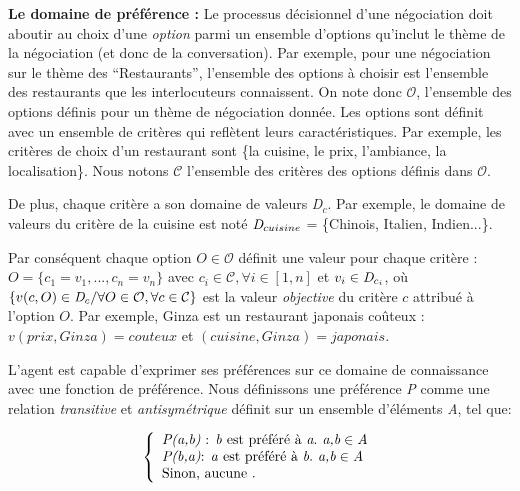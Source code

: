 \documentclass [french]{sig-alternate-05-2015}
\begin{document}

\par \textbf{Le domaine de préférence :}
Le processus décisionnel d'une négociation  doit aboutir au choix d'une \emph{option} parmi un ensemble d'options qu'inclut le thème de la négociation (et donc de la conversation). Par exemple, pour une négociation sur le thème des ``Restaurants'', l'ensemble des options à choisir est l'ensemble des restaurants que les interlocuteurs connaissent.
 On note donc $\mathcal{O}$, l'ensemble des options définis pour un thème de négociation donnée. Les options sont définit avec un ensemble de critères qui reflètent leurs caractéristiques. Par exemple, les critères de choix d'un restaurant sont \{la cuisine, le prix, l'ambiance, la localisation\}. Nous notons $\mathcal{C}$ l'ensemble des critères des options définis dans $\mathcal{O}$.
 \par De plus, chaque critère a son domaine de valeurs \emph{D$_c$}. Par exemple, le domaine de valeurs du critère de la cuisine est noté $\emph{D}_{cuisine}$ = \{Chinois, Italien, Indien...\}.

\par Par conséquent chaque option $O\in \mathcal{O}$ définit une valeur pour chaque critère : 
$O = \{c_1=v_1,..., c_n=v_n\}$ avec $c_i \in \mathcal{C}, \forall i \in [1,n]$ et $v_i\in \emph{D}_{c_i}$, où $\{v(c,O) \in \emph{D}_{c} / \forall O \in \mathcal{O}, \forall c \in \mathcal{C}\}$ est la valeur \emph{objective} du critère $c$ attribué à l'option $O$. 
Par exemple, Ginza est un restaurant japonais coûteux : $v(prix, Ginza) = couteux $ et $(cuisine, Ginza) = japonais$. 


\par L'agent est capable d'exprimer ses préférences sur ce domaine de connaissance avec une fonction de préférence. Nous définissons une préférence \emph{P} comme une relation \emph{transitive} et \emph{antisymétrique} définit sur un ensemble d'éléments \emph{A}, tel que:

\[ \left \{
\begin{array}{l}
\emph{P(a,b)} $ : \emph{b}  est préféré à $\emph{a}. \emph{ a,b} \in \emph{A}\\
\emph{P(b,a)} $:  \emph{a} est préféré à  $\emph{b}. \emph{ a,b} \in \emph{A}\\
$Sinon, aucune . $\\
\end{array}
\right .\]
\end{document}

